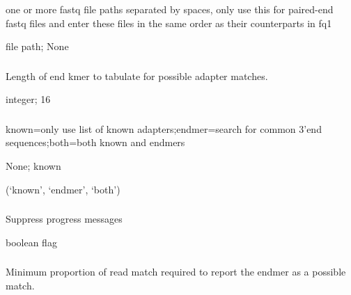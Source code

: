 \documentclass[letterpaper,11pt,english]{sphinxmanual}
\begin{document}
\subsubsection{}
\label{\detokenize{prog_desc:fq2}}
 one or more fastq file paths separated by spaces, only use this for paired-end fastq files and enter these files in the same order as their counterparts in \textendash{}fq1

 file path;  None


\subsubsection{}
\label{\detokenize{prog_desc:k-end-klength}}
 Length of end kmer to tabulate for possible adapter matches.

 integer;  16


\subsubsection{}
\label{\detokenize{prog_desc:m-mode}}
 known=only use list of known adapters;endmer=search for common 3’end sequences;both=both known and endmers

 None;  known

 (‘known’, ‘endmer’, ‘both’)


\subsubsection{}
\label{\detokenize{prog_desc:quiet}}
 Suppress progress messages

 boolean flag


\subsubsection{}
\label{\detokenize{prog_desc:e-end-min-match}}
 Minimum proportion of read match required to report the endmer as a possible match.
\end{document}
